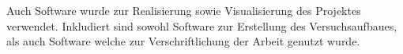 Auch Software wurde zur Realisierung sowie Visualisierung des Projektes verwendet.
Inkludiert sind sowohl Software zur Erstellung des Versuchsaufbaues, als auch Software welche zur Verschriftlichung der Arbeit genutzt wurde.
